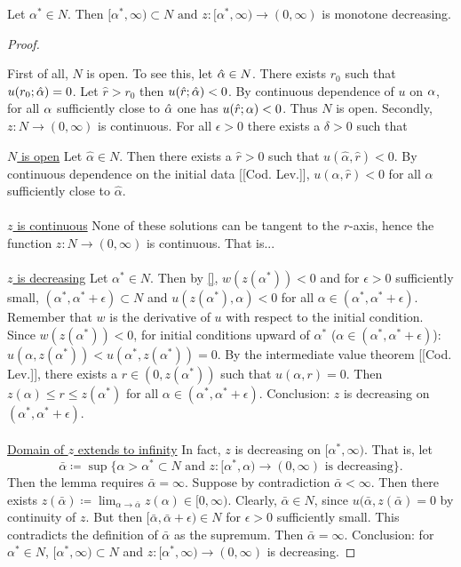 \begin{lemma} Let $\alpha^*\in N$. Then $[\alpha^*,\infty)\subset N\text{ and }z:[\alpha^*,\infty)\to(0,\infty)$ is monotone decreasing.
\begin{proof}
\begin{outline}
  \1 First of all, $N$ is open.
    \2 To see this, let $\hat{\alpha}\in N$.
    \2 There exists $r_0$ such that $u(r_0;\hat{\alpha})=0$.
    \2 Let $\hat r> r_0$ then $u(\hat r;\hat{\alpha})<0$.
    \2 By continuous dependence of $u$ on $\alpha$, for all $\alpha$ sufficiently close to $\hat{\alpha}$ one has $u(\hat r;\alpha)<0$.
    \2 Thus $N$ is open.
  \1 Secondly, $z:N\to(0,\infty)$ is continuous.
    \2 For all $\epsilon>0$ there exists a $\delta>0$ such that
\end{outline}

\underline{$N$ is open}
Let $\hat\alpha\in N$. Then there exists a $\hat r>0$ such that $u(\hat\alpha,\hat r)<0$. By continuous dependence on the initial data [[Cod. Lev.]], $u(\alpha,\hat r)<0$ for all $\alpha$ sufficiently close to $\hat\alpha$.
\\ \\

\underline{$z$ is continuous}
None of these solutions can be tangent to the $r$-axis, hence the function $z:N\to(0,\infty)$ is continuous. That is...
\\ \\

\underline{$z$ is decreasing}
Let $\alpha^*\in N$. Then by \ref{}, $w(z(\alpha^*))<0$ and for $\epsilon>0$ sufficiently small, $(\alpha^*,\alpha^*+\epsilon)\subset N$ and $u(z(\alpha^*),\alpha)<0$ for all $\alpha\in(\alpha^*,\alpha^*+\epsilon)$. Remember that $w$ is the derivative of $u$ with respect to the initial condition. Since $w(z(\alpha^*))<0$, for initial conditions upward of $\alpha^*$ ($\alpha\in(\alpha^*,\alpha^*+\epsilon)$): $u(\alpha,z(\alpha^*))<u(\alpha^*,z(\alpha^*))=0$. By the intermediate value theorem [[Cod. Lev.]], there exists a $r\in(0,z(\alpha^*))$ such that $u(\alpha,r)=0$. Then $z(\alpha)\leq r\leq z(\alpha^*)$ for all $\alpha\in(\alpha^*,\alpha^*+\epsilon)$. Conclusion: $z$ is decreasing on $(\alpha^*,\alpha^*+\epsilon)$.
\\ \\

\underline{Domain of $z$ extends to infinity}
In fact, $z$ is decreasing on $[\alpha^*,\infty)$. That is, let $$\bar\alpha\coloneqq\sup\{\alpha>\alpha^*\subset N\text{ and }z:[\alpha^*,\alpha)\to(0,\infty)\text{ is decreasing}\}.$$ Then the lemma requires $\bar\alpha=\infty$. Suppose by contradiction $\bar\alpha<\infty$.
Then there exists $z(\bar\alpha)\coloneqq\lim_{\alpha\to\bar\alpha}z(\alpha)\in[0,\infty).$ Clearly, $\bar\alpha\in N$, since $u(\bar\alpha,z(\bar\alpha)=0$ by continuity of $z$. But then $[\bar\alpha,\bar\alpha+\epsilon)\in N$ for $\epsilon>0$ sufficiently small. This contradicts the definition of $\bar\alpha$ as the supremum. Then $\bar\alpha=\infty$. Conclusion: for $\alpha^*\in N$, $[\alpha^*,\infty)\subset N$ and $z:[\alpha^*,\infty)\to(0,\infty)$ is decreasing.

\end{proof}
\end{lemma}
